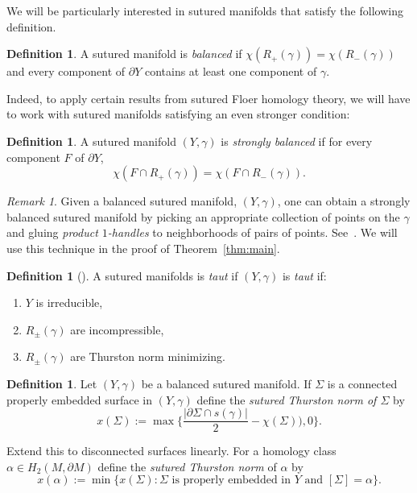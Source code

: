 \documentclass{amsart}
\theoremstyle{definition}
\newtheorem{definition}[theorem]{Definition}
\theoremstyle{remark}
\newtheorem{remark}[theorem]{Remark}
\numberwithin{equation}{section}
\begin{document}
We will be particularly interested in sutured manifolds that satisfy the following definition.

\begin{definition}
A sutured manifold is \emph{balanced} if $\chi(R_+(\gamma))=\chi(R_-(\gamma))$ and every component of $\partial Y$ contains at least one component of $\gamma$.
    \end{definition}

Indeed, to apply certain results from sutured Floer homology theory, we will have to work with sutured manifolds satisfying an even stronger condition:

\begin{definition}
     A sutured manifold $(Y,\gamma)$ is \emph{strongly balanced} if for every component $F$ of $\partial Y$, $${\chi(F\cap R_+(\gamma))=\chi(F\cap R_{-}(\gamma))}.$$
\end{definition}

\begin{remark}\label{rem:stronger}
Given a balanced sutured manifold, $(Y,\gamma)$, one can obtain a strongly balanced sutured manifold by picking an appropriate collection of points on the $\gamma$ and gluing \emph{product $1$-handles} to neighborhoods of pairs of points. See~\cite[Figure 8]{kronheimer2010knots}. We will use this technique in the proof of Theorem~\ref{thm:main}.
\end{remark}

\begin{definition}[{\cite[Definition 2.10]{gabai1983foliations}}]
    A sutured manifolds is \emph{taut} if $(Y,\gamma)$ is \emph{taut} if:\begin{enumerate}
        \item $Y$ is irreducible,
        \item $R_\pm(\gamma)$ are incompressible,
        \item $R_\pm(\gamma)$ are Thurston norm minimizing.
    \end{enumerate}
\end{definition}




\begin{definition}
    Let $(Y,\gamma)$ be a balanced sutured manifold. If $\Sigma$ is a connected properly embedded surface in $(Y,\gamma)$ define the \emph{sutured Thurston norm of $\Sigma$} by \begin{equation*}
        x(\Sigma):=\max\Bigg\{\frac{|\partial \Sigma\cap s(\gamma)|}{2}-\chi(\Sigma)),0\Bigg\}.
    \end{equation*}

    Extend this to disconnected surfaces linearly. For a homology class $\alpha\in H_2(M,\partial M)$ define the \emph{sutured Thurston norm} of $\alpha$ by \begin{equation*}
        x(\alpha):=\min\{x(\Sigma):\Sigma\text{ is properly embedded in }Y\text{ and }[\Sigma]=\alpha\}.
    \end{equation*}
\end{definition}
\end{document}
